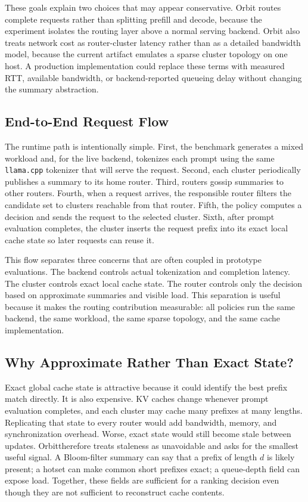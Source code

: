 \documentclass[10pt,twocolumn]{article}
\newcommand{\sys}{Orbit}
\begin{document}
These goals explain two choices that may appear conservative. Orbit routes complete requests rather than splitting prefill and decode, because the experiment isolates the routing layer above a normal serving backend. Orbit also treats network cost as router-cluster latency rather than as a detailed bandwidth model, because the current artifact emulates a sparse cluster topology on one host. A production implementation could replace these terms with measured RTT, available bandwidth, or backend-reported queueing delay without changing the summary abstraction.

\subsection{End-to-End Request Flow}

The runtime path is intentionally simple. First, the benchmark generates a mixed workload and, for the live backend, tokenizes each prompt using the same \texttt{llama.cpp} tokenizer that will serve the request. Second, each cluster periodically publishes a summary to its home router. Third, routers gossip summaries to other routers. Fourth, when a request arrives, the responsible router filters the candidate set to clusters reachable from that router. Fifth, the policy computes a decision and sends the request to the selected cluster. Sixth, after prompt evaluation completes, the cluster inserts the request prefix into its exact local cache state so later requests can reuse it.

This flow separates three concerns that are often coupled in prototype evaluations. The backend controls actual tokenization and completion latency. The cluster controls exact local cache state. The router controls only the decision based on approximate summaries and visible load. This separation is useful because it makes the routing contribution measurable: all policies run the same backend, the same workload, the same sparse topology, and the same cache implementation.

\subsection{Why Approximate Rather Than Exact State?}

Exact global cache state is attractive because it could identify the best prefix match directly. It is also expensive. KV caches change whenever prompt evaluation completes, and each cluster may cache many prefixes at many lengths. Replicating that state to every router would add bandwidth, memory, and synchronization overhead. Worse, exact state would still become stale between updates. \sys therefore treats staleness as unavoidable and asks for the smallest useful signal. A Bloom-filter summary can say that a prefix of length $d$ is likely present; a hotset can make common short prefixes exact; a queue-depth field can expose load. Together, these fields are sufficient for a ranking decision even though they are not sufficient to reconstruct cache contents.
\end{document}

